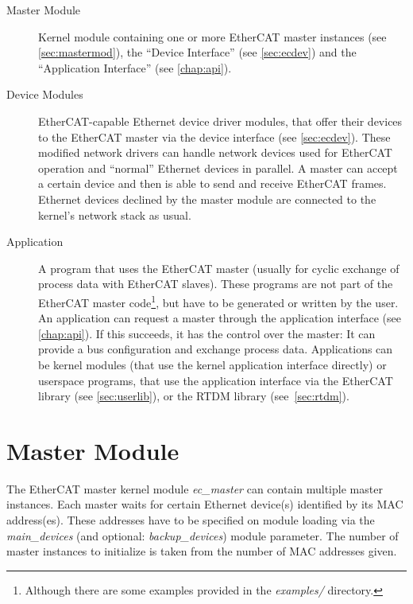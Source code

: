 \documentclass[a4paper,12pt,BCOR6mm,bibtotoc,idxtotoc]{scrbook}
\begin{document}
\begin{description}

\item[Master Module] Kernel module containing one or more
EtherCAT master instances (see \autoref{sec:mastermod}), the ``Device
Interface'' (see \autoref{sec:ecdev}) and the ``Application Interface'' (see
\autoref{chap:api}).

\item[Device Modules] EtherCAT-capable Ethernet device
driver modules, that offer their devices to the EtherCAT
master via the device interface (see \autoref{sec:ecdev}). These modified
network drivers can handle network devices used for EtherCAT operation and
``normal'' Ethernet devices in parallel. A master can accept a certain device
and then is able to send and receive EtherCAT frames. Ethernet devices
declined by the master module are connected to the kernel's network stack as
usual.

\item[Application] A program that uses the EtherCAT master
(usually for cyclic exchange of process data with EtherCAT slaves). These
programs are not part of the EtherCAT master code\footnote{Although there are
some examples provided in the \textit{examples/} directory.}, but have to be
generated or written by the user. An application can request a master through
the application interface (see \autoref{chap:api}). If this succeeds, it has
the control over the master: It can provide a bus configuration and exchange
process data.  Applications can be kernel modules (that use the kernel
application interface directly) or userspace programs, that use the
application interface via the EtherCAT library (see \autoref{sec:userlib}), or
the RTDM library (see~\autoref{sec:rtdm}).

\end{description}


\section{Master Module}
\label{sec:mastermod}

The EtherCAT master kernel module \textit{ec\_master} can contain multiple
master instances. Each master waits for certain Ethernet device(s) identified
by its MAC address(es). These addresses have to be
specified on module loading via the \textit{main\_devices} (and optional:
\textit{backup\_devices}) module parameter.  The number of master instances to
initialize is taken from the number of MAC addresses given.
\end{document}
